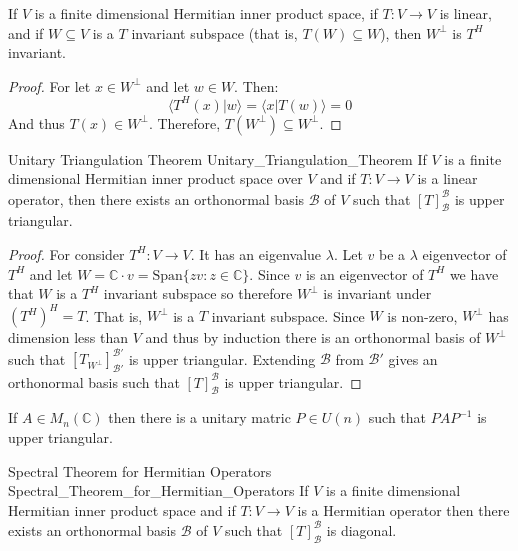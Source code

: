     \begin{theorem}
        If $V$ is a finite dimensional Hermitian inner product space, if
        $T:V\rightarrow{V}$ is linear, and if $W\subseteq{V}$ is a $T$
        invariant subspace (that is, $T(W)\subseteq{W}$), then
        $W^{\perp}$ is $T^{H}$ invariant.
    \end{theorem}
    \begin{proof}
        For let $x\in{W}^{\perp}$ and let $w\in{W}$. Then:
        \begin{equation}
            \langle{T}^{H}(x)|w\rangle
            =\langle{x}|T(w)\rangle=0
        \end{equation}
        And thus $T(x)\in{W}^{\perp}$. Therefore,
        $T(W^{\perp})\subseteq{W}^{\perp}$.
    \end{proof}
    \begin{ltheorem}{Unitary Triangulation Theorem}
                    {Unitary_Triangulation_Theorem}
        If $V$ is a finite dimensional Hermitian inner product space over
        $V$ and if $T:V\rightarrow{V}$ is a linear operator, then there
        exists an orthonormal basis $\mathscr{B}$ of $V$ such that
        $[T]_{\mathscr{B}}^{\mathscr{B}}$ is upper triangular.
    \end{ltheorem}
    \begin{proof}
        For consider $T^{H}:V\rightarrow{V}$. It has an eigenvalue
        $\lambda$. Let $v$ be a $\lambda$ eigenvector of $T^{H}$ and let
        $W=\mathbb{C}\cdot{v}=\textrm{Span}\{zv:z\in\mathbb{C}\}$. Since
        $v$ is an eigenvector of $T^{H}$ we have that $W$ is a $T^{H}$
        invariant subspace so therefore $W^{\perp}$ is invariant under
        $(T^{H})^{H}=T$. That is, $W^{\perp}$ is a $T$ invariant subspace.
        Since $W$ is non-zero, $W^{\perp}$ has dimension less than $V$ and
        thus by induction there is an orthonormal basis of $W^{\perp}$ such
        that $[T_{W^{\perp}}]_{\mathscr{B}'}^{\mathscr{B}'}$ is upper
        triangular. Extending $\mathscr{B}$ from $\mathscr{B}'$ gives an
        orthonormal basis such that $[T]_{\mathscr{B}}^{\mathscr{B}}$ is
        upper triangular.
    \end{proof}
    \begin{theorem}
        If $A\in{M}_{n}(\mathbb{C})$ then there is a unitary matric
        $P\in{U}(n)$ such that $PAP^{\minus{1}}$ is upper triangular.
    \end{theorem}
    \begin{ftheorem}{Spectral Theorem for Hermitian Operators}
                    {Spectral_Theorem_for_Hermitian_Operators}
        If $V$ is a finite dimensional Hermitian inner product space and if
        $T:V\rightarrow{V}$ is a Hermitian operator then there exists an
        orthonormal basis $\mathscr{B}$ of $V$ such that
        $[T]_{\mathscr{B}}^{\mathscr{B}}$ is diagonal.
    \end{ftheorem}
